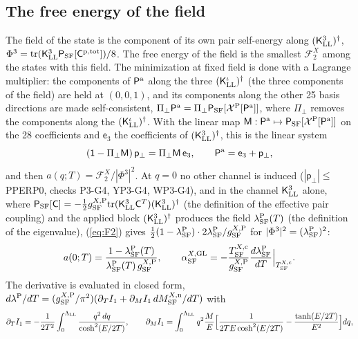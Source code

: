 \documentclass[aps,prd,onecolumn,superscriptaddress,nofootinbib,floatfix,longbibliography]{revtex4-2}
\newcommand{\LL}{{\rm LL}}
\newcommand{\SF}{{\rm SF}}
\newcommand{\tr}{\mathrm{tr}}
\begin{document}
\subsection{The free energy of the field}

The field of the state is the component of its own pair self-energy along $(\mathsf K^3_\LL)^\dagger$,
$\Phi^3=\tr(\mathsf K^3_\LL\mathsf P_\SF[\mathsf C^{\rm p,tot}])/8$. The free energy of the field is the smallest $\mathcal F^X_2$ among the states with
this field. The minimization at fixed field is done with a Lagrange multiplier: the components of $\mathsf P^{\rm a}$ along the three
$(\mathsf K^\iota_\LL)^\dagger$ (the three components of the field) are held at $(0,0,1)$, and its components along the other 25 basis
directions are made self-consistent, $\Pi_\perp\mathsf P^{\rm a}=\Pi_\perp\mathsf P_\SF[\mathcal X^{\rm P}[\mathsf P^{\rm a}]]$, where $\Pi_\perp$ removes the components
along the $(\mathsf K^\iota_\LL)^\dagger$. With the linear map $\mathsf M:\mathsf P^{\rm a}\mapsto\mathsf P_\SF[\mathcal X^{\rm P}[\mathsf P^{\rm a}]]$ on the 28 coefficients and
$\mathsf e_3$ the coefficients of $(\mathsf K^3_\LL)^\dagger$, this is the linear system
\begin{equation}
(\mathsf 1-\Pi_\perp\mathsf M)\,\mathsf p_\perp=\Pi_\perp\mathsf M\,\mathsf e_3,\qquad\mathsf P^{\rm a}=\mathsf e_3+\mathsf p_\perp ,
\label{eq:linsys}
\end{equation}
and then $a(q;T)=\mathcal F^X_2/|\Phi^3|^2$. At $q=0$ no other channel is induced ($|\mathsf p_\perp|\le${} {{PPERP0}}, checks P3-G4, YP3-G4, WP3-G4), and in the
channel $\mathsf K^3_\LL$ alone, where $\mathsf P_\SF[\mathsf C]=-\frac12g^{X,{\rm P}}_\SF\tr(\mathsf K^3_\LL\mathsf C^T)(\mathsf K^3_\LL)^\dagger$ (the definition of the effective
pair coupling) and the applied block $(\mathsf K^3_\LL)^\dagger$ produces the field $\lambda^{\rm P}_\SF(T)$ (the definition of the eigenvalue),
(\ref{eq:F2}) gives $\frac12(1-\lambda^{\rm P}_\SF)\cdot2\lambda^{\rm P}_\SF/g^{X,{\rm P}}_\SF$ for $|\Phi^3|^2=(\lambda^{\rm P}_\SF)^2$:
\begin{equation}
a(0;T)=\frac{1-\lambda^{\rm P}_\SF(T)}{\lambda^{\rm P}_\SF(T)\,g^{X,{\rm P}}_\SF},\qquad\alpha^{X,{\rm GL}}_\SF=-\frac{T^{X,{\rm c}}_\SF}{g^{X,{\rm P}}_\SF}\frac{d\lambda^{\rm P}_\SF}{dT}\Big|_{T^{X,{\rm c}}_\SF}.
\label{eq:a0}
\end{equation}
The derivative is evaluated in closed form, $d\lambda^{\rm P}/dT=(g^{X,{\rm P}}_\SF/\pi^2)(\partial_TI_1+\partial_MI_1\,dM^{X,{\rm n}}_\SF/dT)$ with
\begin{equation}
\partial_TI_1=-\frac1{2T^2}\int_0^{\Lambda_\LL}\frac{q^2\,dq}{\cosh^2(E/2T)},\qquad\partial_MI_1=\int_0^{\Lambda_\LL}q^2\frac{M}{E}\Big[\frac1{2TE\cosh^2(E/2T)}-\frac{\tanh(E/2T)}{E^2}\Big]dq,
\label{eq:dI}
\end{equation}
\end{document}
